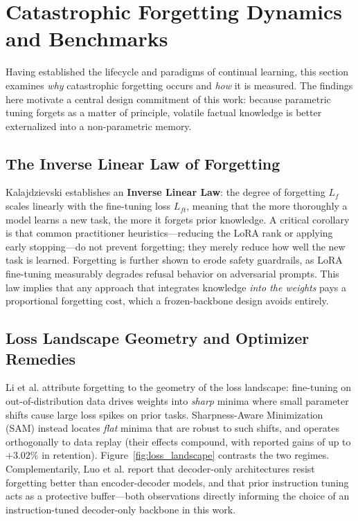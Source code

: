 \section{Catastrophic Forgetting Dynamics and Benchmarks}

Having established the lifecycle and paradigms of continual learning, this section examines \emph{why} catastrophic forgetting occurs and \emph{how} it is measured. The findings here motivate a central design commitment of this work: because parametric tuning forgets as a matter of principle, volatile factual knowledge is better externalized into a non-parametric memory.

\subsection{The Inverse Linear Law of Forgetting}
Kalajdzievski \parencite{kalajdzievski2024scalinglawsforgettingfinetuning} establishes an \textbf{Inverse Linear Law}: the degree of forgetting $L_f$ scales linearly with the fine-tuning loss $L_{ft}$, meaning that the more thoroughly a model learns a new task, the more it forgets prior knowledge. A critical corollary is that common practitioner heuristics---reducing the LoRA rank or applying early stopping---do not prevent forgetting; they merely reduce how well the new task is learned. Forgetting is further shown to erode safety guardrails, as LoRA fine-tuning measurably degrades refusal behavior on adversarial prompts. This law implies that any approach that integrates knowledge \emph{into the weights} pays a proportional forgetting cost, which a frozen-backbone design avoids entirely.

\subsection{Loss Landscape Geometry and Optimizer Remedies}
Li et al. \parencite{li2024revisitingcatastrophicforgettinglarge} attribute forgetting to the geometry of the loss landscape: fine-tuning on out-of-distribution data drives weights into \emph{sharp} minima where small parameter shifts cause large loss spikes on prior tasks. Sharpness-Aware Minimization (SAM) instead locates \emph{flat} minima that are robust to such shifts, and operates orthogonally to data replay (their effects compound, with reported gains of up to $+3.02\%$ in retention). Figure~\ref{fig:loss_landscape} contrasts the two regimes. Complementarily, Luo et al. \parencite{luo2025empiricalstudycatastrophicforgetting} report that decoder-only architectures resist forgetting better than encoder-decoder models, and that prior instruction tuning acts as a protective buffer---both observations directly informing the choice of an instruction-tuned decoder-only backbone in this work.

